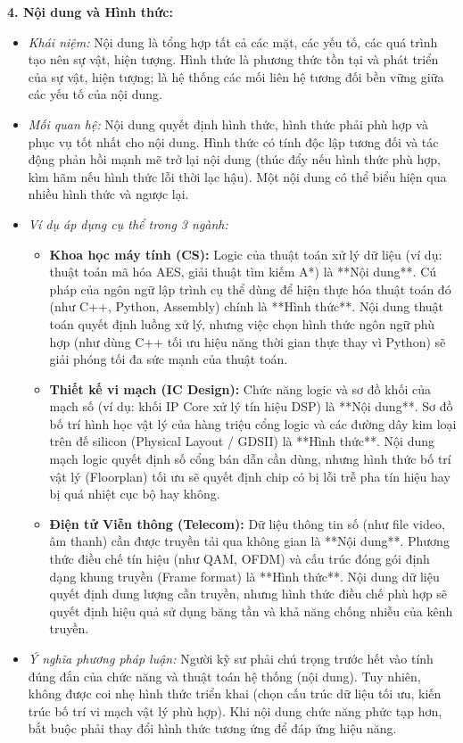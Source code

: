 \documentclass[12pt,a4paper]{article}
\begin{document}
{\noindent
\textbf{4. Nội dung và Hình thức:}
\begin{itemize}
    \item \textit{Khái niệm:} Nội dung là tổng hợp tất cả các mặt, các yếu tố, các quá trình tạo nên sự vật, hiện tượng. Hình thức là phương thức tồn tại và phát triển của sự vật, hiện tượng; là hệ thống các mối liên hệ tương đối bền vững giữa các yếu tố của nội dung.
    \item \textit{Mối quan hệ:} Nội dung quyết định hình thức, hình thức phải phù hợp và phục vụ tốt nhất cho nội dung. Hình thức có tính độc lập tương đối và tác động phản hồi mạnh mẽ trở lại nội dung (thúc đẩy nếu hình thức phù hợp, kìm hãm nếu hình thức lỗi thời lạc hậu). Một nội dung có thể biểu hiện qua nhiều hình thức và ngược lại.
    \item \textit{Ví dụ áp dụng cụ thể trong 3 ngành:}
    \begin{itemize}
        \item \textbf{Khoa học máy tính (CS):} Logic của thuật toán xử lý dữ liệu (ví dụ: thuật toán mã hóa AES, giải thuật tìm kiếm A*) là **Nội dung**. Cú pháp của ngôn ngữ lập trình cụ thể dùng để hiện thực hóa thuật toán đó (như C++, Python, Assembly) chính là **Hình thức**. Nội dung thuật toán quyết định luồng xử lý, nhưng việc chọn hình thức ngôn ngữ phù hợp (như dùng C++ tối ưu hiệu năng thời gian thực thay vì Python) sẽ giải phóng tối đa sức mạnh của thuật toán.
        \item \textbf{Thiết kế vi mạch (IC Design):} Chức năng logic và sơ đồ khối của mạch số (ví dụ: khối IP Core xử lý tín hiệu DSP) là **Nội dung**. Sơ đồ bố trí hình học vật lý của hàng triệu cổng logic và các đường dây kim loại trên đế silicon (Physical Layout / GDSII) là **Hình thức**. Nội dung mạch logic quyết định số cổng bán dẫn cần dùng, nhưng hình thức bố trí vật lý (Floorplan) tối ưu sẽ quyết định chip có bị lỗi trễ pha tín hiệu hay bị quá nhiệt cục bộ hay không.
        \item \textbf{Điện tử Viễn thông (Telecom):} Dữ liệu thông tin số (như file video, âm thanh) cần được truyền tải qua không gian là **Nội dung**. Phương thức điều chế tín hiệu (như QAM, OFDM) và cấu trúc đóng gói định dạng khung truyền (Frame format) là **Hình thức**. Nội dung dữ liệu quyết định dung lượng cần truyền, nhưng hình thức điều chế phù hợp sẽ quyết định hiệu quả sử dụng băng tần và khả năng chống nhiễu của kênh truyền.
    \end{itemize}
    \item \textit{Ý nghĩa phương pháp luận:} Người kỹ sư phải chú trọng trước hết vào tính đúng đắn của chức năng và thuật toán hệ thống (nội dung). Tuy nhiên, không được coi nhẹ hình thức triển khai (chọn cấu trúc dữ liệu tối ưu, kiến trúc bố trí vi mạch vật lý phù hợp). Khi nội dung chức năng phức tạp hơn, bắt buộc phải thay đổi hình thức tương ứng để đáp ứng hiệu năng.
\end{itemize}

}
\end{document}
